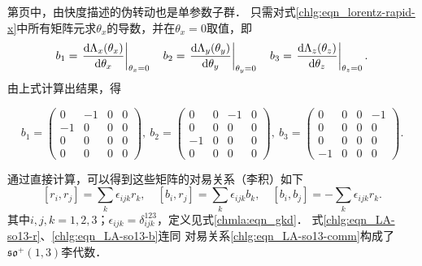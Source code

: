 第\pageref{chlg:sec_rapid}页中，由快度描述的伪转动也是单参数子群．
只需对式\eqref{chlg:eqn_lorentz-rapid-x}中所有矩阵元求$\theta_x$的导数，并在$\theta_x=0$取值，即
\begin{equation}
    b_1=\left.\frac{{\rm d}\Lambda_x(\theta_x)}{{\rm d}\theta_x}\right|_{\theta_x=0} \quad
    b_2=\left.\frac{{\rm d}\Lambda_y(\theta_y)}{{\rm d}\theta_y}\right|_{\theta_y=0} \quad
    b_3=\left.\frac{{\rm d}\Lambda_z(\theta_z)}{{\rm d}\theta_z}\right|_{\theta_z=0} .
\end{equation}
由上式计算出结果，得
\begin{small}
\setlength{\mathindent}{0em}
\begin{equation}\label{chlg:eqn_LA-so13-b}
    b_1=  \begin{pmatrix}
        0  & -1 & 0 & 0 \\
        -1 & 0  & 0 & 0 \\
        0 & 0 & 0 & 0 \\
        0 & 0 & 0 & 0 
    \end{pmatrix},\ 
    b_2 =  \begin{pmatrix}
        0  & 0 & -1 & 0 \\
        0 & 0  & 0 & 0 \\
        -1 & 0 & 0 & 0 \\
        0 & 0 & 0 & 0 
    \end{pmatrix},\ 
    b_3 =  \begin{pmatrix}
        0  & 0 & 0 & -1 \\
        0 & 0  & 0 & 0 \\
        0 & 0 & 0 & 0 \\
        -1 & 0 & 0 & 0 
    \end{pmatrix} .
\end{equation} \setlength{\mathindent}{2em}
\end{small}

通过直接计算，可以得到这些矩阵的对易关系（李积）如下
\begin{equation}\label{chlg:eqn_LA-so13-comm}
    [r_i, r_j] = \sum_k \epsilon_{ijk} r_k,\quad
    [b_i, r_j] = \sum_k \epsilon_{ijk} b_k,\quad
    [b_i, b_j] = -\sum_k \epsilon_{ijk} r_k.
\end{equation}
其中$i,j,k=1,2,3$；$\epsilon_{ijk}=\delta^{123}_{ijk}$，定义见式\eqref{chmla:eqn_gkd}．
式\eqref{chlg:eqn_LA-so13-r}、\eqref{chlg:eqn_LA-so13-b}连同
对易关系\eqref{chlg:eqn_LA-so13-comm}构成了$\mathfrak{so}^{+}(1,3)$李代数．




